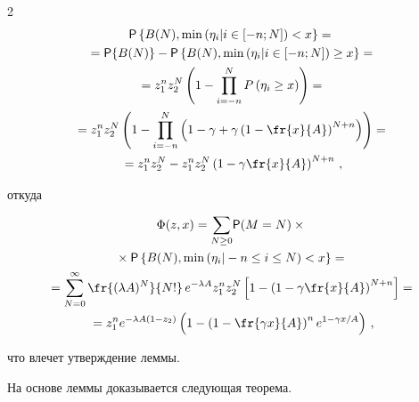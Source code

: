 \begin{multicols}{2}
\begin{multline*}
  {\sf P}\left\{ B(N),\min\left( \eta_i\vert i\in [-n;N]\right)<x\right\} ={}\\


  {}={\sf P}\{B(N)\}- {\sf P}\left\{ B(N),\min\left( \eta_i\vert i\in [-n;N]\right) \geq 


x\right\}={}\\


  {}=z_1^n z_2^N \left(1-\prod\limits^N_{i=-n} P\left( \eta_i\geq 


x\right)\right)={}\\


  {}=z_1^n z_2^N\left( 1-\prod^N_{i=-n} \left( 1-\gamma+\gamma\left( 1-


\fr{x}{A}\right)^{N+n}\right)\right)={}\\


  {}= z_1^n z_2^N -z_1^n z_2^N \left(1-\gamma\fr{x}{A}\right)^{N+n}\,,


  \end{multline*}


откуда


\begin{multline*}


\Phi(z,x) =\sum\limits_{N\geq 0} \! {\sf P}(M=N) \times{}\\


{}\times {\sf P}\left\{ B(N),\min \left( \eta_i\vert -


n\leq i\leq N\right) <x\right\}={}\\


{}=


\sum\limits^\infty_{N=0} \fr{(\lambda A)^N}{N!}\,e^{-\lambda A} z_1^n 


z_2^N\left[ 1-\left( 1-\gamma\fr{x}{A}\right)^{N+n}\right]={}\\


{}=


z_1^n e^{-\lambda A(1-z_2)}\left( 1-\left( 1-\fr{\gamma x}{A}\right)^n e^{1-


\gamma x/A}\right)\,,


\end{multline*}


что влечет утверждение леммы. 





\smallskip





  На основе леммы доказывается следующая теорема.



\end{multicols}
